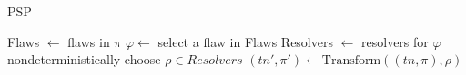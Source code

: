 \begin{algorithm}
  \caption{PSP}
  \label{alg:background:psp}
  \KwOut{$\pi$}
  Flaws $\leftarrow$ flaws in $\pi$\;
  $\varphi \leftarrow$ select a flaw in Flaws\;
  Resolvers $\leftarrow$ resolvers for $\varphi$\;
  nondeterministically choose $\rho \in Resolvers$\;
  $(tn',\pi') \leftarrow \text{Transform}((tn,\pi), \rho)$\;
\end{algorithm}






